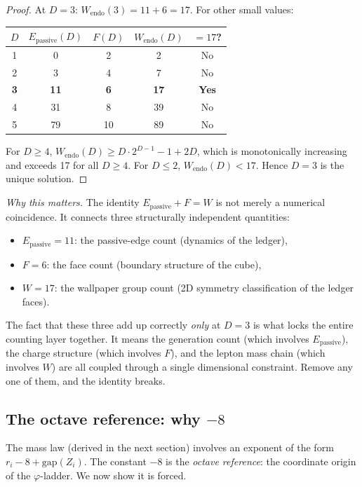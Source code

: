 \documentclass[11pt,a4paper]{article}
\theoremstyle{definition}
\theoremstyle{remark}
\newcommand{\phig}{\varphi}
\newcommand{\Epass}{E_{\mathrm{passive}}}
\begin{document}
\begin{proof}
At $D = 3$: $W_{\mathrm{endo}}(3) = 11 + 6 = 17$.  For other small values:

\smallskip
\begin{center}
\begin{tabular}{ccccc}
\toprule
$D$ & $\Epass(D)$ & $F(D)$ & $W_{\mathrm{endo}}(D)$ & $= 17$? \\
\midrule
1 & 0 & 2 & 2 & No \\
2 & 3 & 4 & 7 & No \\
\textbf{3} & \textbf{11} & \textbf{6} & \textbf{17} & \textbf{Yes} \\
4 & 31 & 8 & 39 & No \\
5 & 79 & 10 & 89 & No \\
\bottomrule
\end{tabular}
\end{center}

\smallskip\noindent
For $D \geq 4$, $W_{\mathrm{endo}}(D) \geq D \cdot 2^{D-1} - 1 + 2D$,
which is monotonically increasing and exceeds 17 for all $D \geq 4$.
For $D \leq 2$, $W_{\mathrm{endo}}(D) < 17$.  Hence $D = 3$ is the unique
solution.
\end{proof}

\noindent\textit{Why this matters.}\quad
The identity $\Epass + F = W$ is not merely a numerical coincidence.  It
connects three structurally independent quantities:
\begin{itemize}[nosep]
  \item $\Epass = 11$: the passive-edge count (dynamics of the ledger),
  \item $F = 6$: the face count (boundary structure of the cube),
  \item $W = 17$: the wallpaper group count (2D symmetry classification of the
        ledger faces).
\end{itemize}
The fact that these three add up correctly \emph{only} at $D = 3$ is what
locks the entire counting layer together.  It means the generation count
(which involves $\Epass$), the charge structure (which involves $F$), and the
lepton mass chain (which involves $W$) are all coupled through a single
dimensional constraint.  Remove any one of them, and the identity breaks.

\subsection{The octave reference: why $-8$}

The mass law (derived in the next section) involves an exponent of the form
$r_i - 8 + \mathrm{gap}(Z_i)$.  The constant $-8$ is the \emph{octave
reference}: the coordinate origin of the $\phig$-ladder.  We now show it is
forced.
\end{document}
